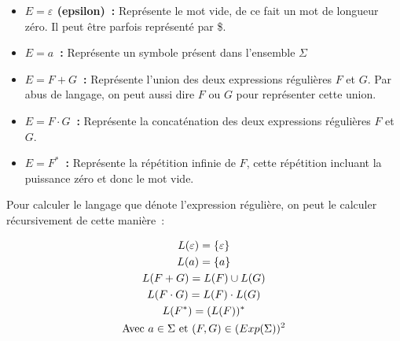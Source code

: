 \begin{itemize}
    \item[\textbullet] \textbf{\(E = \varepsilon\) (epsilon)~:}
        Représente le mot vide, de ce fait un mot de longueur zéro. Il peut être
        parfois représenté par \og{}\$\fg{}.

        \vphantom{}

    \item[\textbullet] \textbf{\(E = a\)~:} Représente un symbole
        présent dans l'ensemble \(\Sigma\)

        \vphantom{}

    \item[\textbullet] \textbf{\(E = F + G\)~:} Représente l'union
        des deux expressions régulières \(F\) et \(G\). Par abus de langage, on
        peut aussi dire \(F\) \og{}ou\fg{} \(G\) pour représenter cette union.

        \vphantom{}

    \item[\textbullet] \textbf{\(E = F \cdot G\)~:}
        Représente la concaténation des deux expressions régulières \(F\) et
        \(G\).

        \vphantom{}

    \item[\textbullet] \textbf{\(E = F^* \)~:} Représente la répétition
        infinie de \(F\), cette répétition incluant la puissance zéro et donc
        le mot vide.
\end{itemize}

\vphantom{}

Pour calculer le langage que dénote l'expression régulière, on peut le calculer
récursivement de cette manière~:

\begin{gather*}
    L(\varepsilon) = \{\varepsilon\} \\
    L(a) = \{a\} \\
    L(F + G) = L(F) \cup L(G) \\
    L(F \cdot G) = L(F) \cdot L(G) \\
    L(F^*) = (L(F))^* \\
    \text{Avec } a \in \Sigma \text{ et } (F, G) \in (Exp(\Sigma))^2 \notag
\end{gather*}

